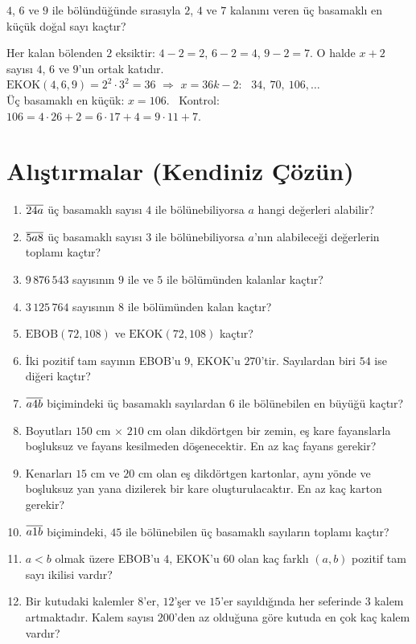 \begin{alistirma}
\(4\), \(6\) ve \(9\) ile bölündüğünde sırasıyla \(2\), \(4\) ve \(7\) kalanını veren üç basamaklı en küçük doğal sayı kaçtır?
\end{alistirma}
\begin{cozum}
Her kalan bölenden \(2\) eksiktir: \(4-2=2\), \(6-2=4\), \(9-2=7\). O halde \(x+2\) sayısı \(4\), \(6\) ve \(9\)'un ortak katıdır.\\
\(\text{EKOK}(4,6,9)=2^2\cdot 3^2=36\) \(\Rightarrow\) \(x=36k-2\): \ \(34,\ 70,\ 106,\dots\)\\
Üç basamaklı en küçük: \(x=106\). \ Kontrol: \(106=4\cdot 26+2=6\cdot 17+4=9\cdot 11+7\).
\end{cozum}

\kendinizoncesi
\section{Alıştırmalar (Kendiniz Çözün)}

\begin{enumerate}[label=\textbf{\arabic*.},leftmargin=*,itemsep=4pt]
\item \(\overline{24a}\) üç basamaklı sayısı \(4\) ile bölünebiliyorsa \(a\) hangi değerleri alabilir?
\item \(\overline{5a8}\) üç basamaklı sayısı \(3\) ile bölünebiliyorsa \(a\)'nın alabileceği değerlerin toplamı kaçtır?
\item \(9\,876\,543\) sayısının \(9\) ile ve \(5\) ile bölümünden kalanlar kaçtır?
\item \(3\,125\,764\) sayısının \(8\) ile bölümünden kalan kaçtır?
\item \(\text{EBOB}(72,108)\) ve \(\text{EKOK}(72,108)\) kaçtır?
\item İki pozitif tam sayının EBOB'u \(9\), EKOK'u \(270\)'tir. Sayılardan biri \(54\) ise diğeri kaçtır?
\item \(\overline{a4b}\) biçimindeki üç basamaklı sayılardan \(6\) ile bölünebilen en büyüğü kaçtır?
\item Boyutları \(150\) cm \(\times\) \(210\) cm olan dikdörtgen bir zemin, eş kare fayanslarla boşluksuz ve fayans kesilmeden döşenecektir. En az kaç fayans gerekir?
\item Kenarları \(15\) cm ve \(20\) cm olan eş dikdörtgen kartonlar, aynı yönde ve boşluksuz yan yana dizilerek bir kare oluşturulacaktır. En az kaç karton gerekir?
\item \(\overline{a1b}\) biçimindeki, \(45\) ile bölünebilen üç basamaklı sayıların toplamı kaçtır?
\item \(a<b\) olmak üzere EBOB'u \(4\), EKOK'u \(60\) olan kaç farklı \((a,b)\) pozitif tam sayı ikilisi vardır?
\item Bir kutudaki kalemler \(8\)'er, \(12\)'şer ve \(15\)'er sayıldığında her seferinde \(3\) kalem artmaktadır. Kalem sayısı \(200\)'den az olduğuna göre kutuda en çok kaç kalem vardır?
\end{enumerate}

